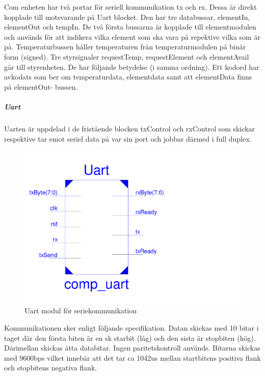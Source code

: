\documentclass[a4paper]{scrartcl}
\begin{document}
	Com enheten har två portar för seriell kommunikation tx och rx. Dessa är direkt kopplade till motsvarande på Uart blocket.
	Den har tre databussar, elementIn, elementOut och tempIn. De två första bussarna är kopplade till elementmodulen och används för att indikera vilka element som ska vara på repektive vilka som är på. Temperaturbussen håller temperaturen 			från temperaturmodulen på binär form (signed).
		Tre styrsignaler requestTemp, requestElement och elementAvail går till styrenheten. De har följande betydelse (i samma ordning). Ett kodord har avkodats som ber om temperaturdata, elementdata samt att elementData finns på elementOut-				bussen.
		\subparagraph{Uart}
		Uarten är uppdelad i de fristående blocken txControl och rxControl som skickar respektive tar emot seriel data på var sin port och jobbar därmed i full duplex.
	\begin{figure}[H]
			\centering
			\includegraphics[scale=0.3]{uartschematic.pdf}
			\caption{Uart modul för seriekommunikation}
		\end{figure}
	Kommunikationen sker enligt följande specifikation.
	Datan skickas med 10 bitar i taget där den första biten är en sk starbit (låg) och den sista är stopbiten (hög). Därimellan skickas åtta databitar. Ingen paritetskontroll används. Bitarna skickas med 9600bps vilket innebär att det tar ca 1042us 				mellan startbitens positiva flank och stopbitens negativa flank.
\end{document}
